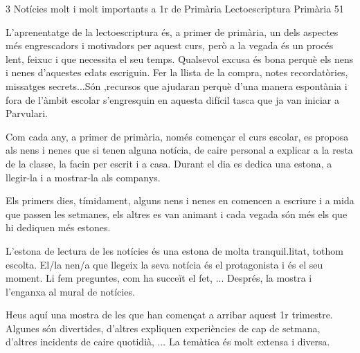 \begin{news}
{3} %
{Notícies molt i molt importants a 1r de Primària}
{Lectoescriptura}
{Primària}
{51} %


L'aprenentatge de la lectoescriptura és, a primer de primària, un dels aspectes més engrescadors i motivadors per aquest curs, però a la vegada és un procés lent, feixuc i que necessita el seu temps. Qualsevol excusa és bona perquè els nens i nenes d'aquestes edats escriguin. Fer la llista de la compra, notes recordatòries, missatges secrets...Són ,recursos que ajudaran perquè d'una manera espontània i fora de l'àmbit escolar s'engresquin en aquesta difícil tasca que ja van iniciar a Parvulari.

Com cada any, a primer de primària, només començar el curs escolar, es proposa als nens i nenes que si tenen alguna notícia, de caire personal a explicar a la resta de la classe, la facin per escrit i a casa. Durant el  dia es dedica una estona, a llegir-la i a mostrar-la als companys. 

Els primers dies, tímidament, alguns nens i nenes en comencen a escriure i a mida que passen les setmanes, els altres es van animant i cada vegada són més els que hi dediquen més estones.

L'estona de lectura de les notícies és una estona de molta tranquil.litat, tothom escolta. El/la nen/a que llegeix la seva notícia és el protagonista i és el seu moment. Li fem preguntes, com ha succeït el fet, ... Després, la mostra i l'enganxa al mural de notícies.

Heus aquí una mostra de les que han començat a arribar aquest 1r trimestre. Algunes són divertides, d'altres expliquen experiències de cap de setmana, d'altres incidents de caire quotidià, ... La temàtica és molt extensa i diversa.


\end{news}


